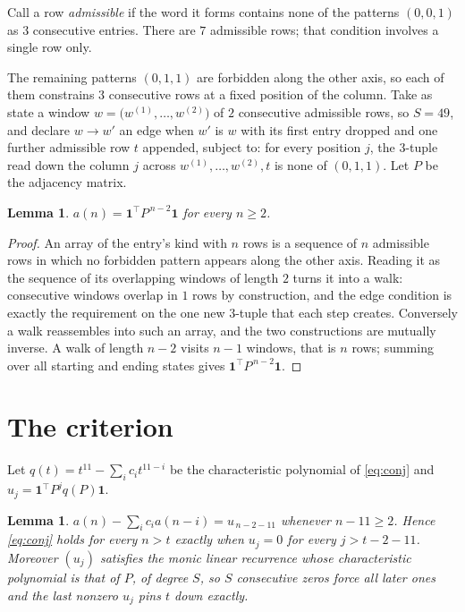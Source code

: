 \documentclass[11pt,a4paper]{article}
\theoremstyle{plain}
\newtheorem{lemma}[theorem]{Lemma}
\theoremstyle{definition}
\begin{document}
Call a row \emph{admissible} if the word it forms contains none of the patterns
$(0,0,1)$ as $3$ consecutive entries. There are $7$ admissible rows; that condition
involves a single row only.

The remaining patterns $(0,1,1)$ are forbidden along the other axis, so each of them
constrains $3$ consecutive rows at a fixed position of the column. Take as state a
window $w=\bigl(w^{(1)},\dots,w^{(2)}\bigr)$ of $2$ consecutive admissible
rows, so $S=49$, and declare $w\to w'$ an edge when $w'$ is $w$ with its first entry
dropped and one further admissible row $t$ appended, subject to: for every position
$j$, the $3$-tuple read down the column $j$ across $w^{(1)},\dots,w^{(2)},t$
is none of $(0,1,1)$. Let $P$ be the adjacency matrix.

\begin{lemma}\label{lem:walk}
$a(n)=\mathbf{1}^{\!\top}P^{\,n-2}\mathbf{1}$ for every $n\ge2$.
\end{lemma}

\begin{proof}
An array of the entry's kind with $n$ rows is a sequence of $n$ admissible rows in
which no forbidden pattern appears along the other axis. Reading it as the sequence of its
overlapping windows of length $2$ turns it into a walk: consecutive windows overlap in
$1$ rows by construction, and the edge condition is exactly the requirement on the one
new $3$-tuple that each step creates. Conversely a walk reassembles into such an array,
and the two constructions are mutually inverse. A walk of length $n-2$ visits $n-1$
windows, that is $n$ rows; summing over all starting and ending states gives
$\mathbf{1}^{\!\top}P^{\,n-2}\mathbf{1}$.
\end{proof}

\section{The criterion}

Let $q(t)=t^{11}-\sum_i c_i t^{11-i}$ be the characteristic polynomial of
\eqref{eq:conj} and $u_j=\mathbf{1}^{\!\top}P^{j}q(P)\mathbf{1}$.

\begin{lemma}\label{lem:crit}
$a(n)-\sum_i c_i a(n-i)=u_{\,n-2-11}$ whenever $n-11\ge2$. Hence
\eqref{eq:conj} holds for every $n>t$ exactly when $u_j=0$ for every
$j>t-2-11$. Moreover $(u_j)$ satisfies the monic linear recurrence whose
characteristic polynomial is that of $P$, of degree $S$, so $S$ consecutive zeros force all
later ones and the last nonzero $u_j$ pins $t$ down exactly.
\end{lemma}
\end{document}
